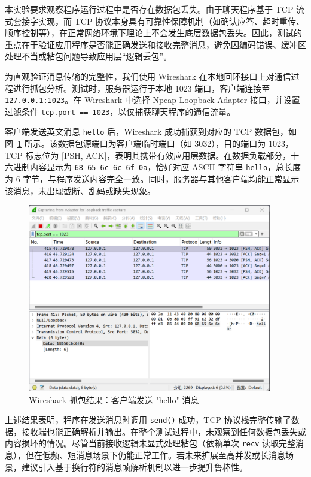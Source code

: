 \documentclass[12pt, a4paper]{article}
\begin{document}
本实验要求观察程序运行过程中是否存在数据包丢失。由于聊天程序基于 TCP 流式套接字实现，而 TCP 协议本身具有可靠性保障机制（如确认应答、超时重传、顺序控制等），在正常网络环境下理论上不会发生底层数据包丢失。因此，测试的重点在于验证应用程序是否能正确发送和接收完整消息，避免因编码错误、缓冲区处理不当或粘包问题导致应用层“逻辑丢包”。

为直观验证消息传输的完整性，我们使用 Wireshark 在本地回环接口上对通信过程进行抓包分析。测试时，服务器运行于本地 1023 端口，客户端连接至 \texttt{127.0.0.1:1023}。在 Wireshark 中选择 Npcap Loopback Adapter 接口，并设置过滤条件 \texttt{tcp.port == 1023}，以仅捕获聊天程序的通信流量。

客户端发送英文消息 \texttt{hello} 后，Wireshark 成功捕获到对应的 TCP 数据包，如图~\ref{fig:wireshark_hello} 所示。该数据包源端口为客户端临时端口（如 3032），目的端口为 1023，TCP 标志位为 [PSH, ACK]，表明其携带有效应用层数据。在数据负载部分，十六进制内容显示为 \texttt{68 65 6c 6c 6f 0a}，恰好对应 ASCII 字符串 \texttt{hello}，总长度为 6 字节，与程序发送内容完全一致。同时，服务器与其他客户端均能正常显示该消息，未出现截断、乱码或缺失现象。

\begin{figure}[H]
   \centering
   \includegraphics[width=0.95\textwidth]{pic/wireshark_hello.png}
   \caption{Wireshark 抓包结果：客户端发送 "hello" 消息}
   \label{fig:wireshark_hello}
\end{figure}

上述结果表明，程序在发送消息时调用 \texttt{send()} 成功，TCP 协议栈完整传输了数据，接收端也能正确解析并输出。在整个测试过程中，未观察到任何数据包丢失或内容损坏的情况。尽管当前接收逻辑未显式处理粘包（依赖单次 \texttt{recv} 读取完整消息），但在低频、短消息场景下仍能正常工作。若未来扩展至高并发或长消息场景，建议引入基于换行符的消息帧解析机制以进一步提升鲁棒性。
\end{document}

